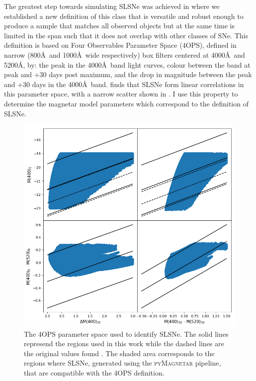 The greatest step towards simulating SLSNe was achieved in \citet{Inserra2018a} where we established a new definition of this class that is versatile and robust enough to produce a sample that matches all observed objects but at the same time is limited in the span such that it does not overlap with other classes of SNe. This definition is based on Four Observables Parameter Space (4OPS), defined in narrow (800\AA~and 1000\AA~wide respectively) box filters centered at 4000\AA~and 5200\AA, by: the peak in the 4000\AA~band light curves, colour between the band at peak and +30 days post maximum, and the drop in magnitude between the peak and +30 days in the 4000\AA~band. \citet{Inserra2018a} finds that SLSNe form linear correlations in this parameter space, with a narrow scatter shown in . I use this property to determine the magnetar model parameters which correspond to the definition of SLSNe.

\begin{figure}
  \includegraphics[width=\textwidth]{Figures/Chapter5/4ops.png}
  \caption{The 4OPS parameter space used to identify SLSNe. The solid lines represend the regions used in this work while the dashed lines are the original values found \citet{Inserra2018a}. The shaded area corresponds to the regions where SLSNe, generated using the \textsc{pyMagnetar} pipeline, that are compatible with the 4OPS definition.}
  \label{fig:4OPS}
\end{figure}


